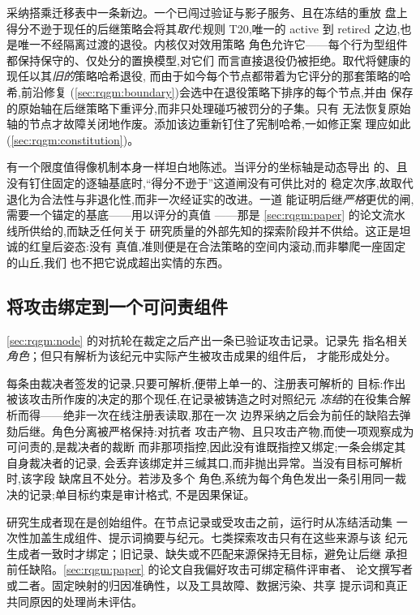 采纳搭乘迁移表中一条新边。一个已闯过验证与影子服务、且在冻结的重放
盘上得分不逊于现任的后继策略会将其\emph{取代}:规则 T20,唯一的
active 到 retired 之边,也是唯一不经隔离过渡的退役。内核仅对效用策略
角色允许它——每个行为型组件都保持保守的、仅处分的置换模型,对它们
而言直接退役仍被拒绝。取代将健康的现任以其\emph{旧的}策略哈希退役,
而由于如今每个节点都带着为它评分的那套策略的哈希,前沿修复
(\cref{sec:rqgm:boundary})会选中在退役策略下排序的每个节点,并由
保存的原始轴在后继策略下重评分,而非只处理碰巧被罚分的子集。只有
无法恢复原始轴的节点才故障关闭地作废。添加该边重新钉住了宪制哈希,一如修正案
理应如此(\cref{sec:rqgm:constitution})。

有一个限度值得像机制本身一样坦白地陈述。当评分的坐标轴是动态导出
的、且没有钉住固定的逐轴基底时,“得分不逊于”这道闸没有可供比对的
稳定次序,故取代退化为合法性与非退化性,而非一次经证实的改进。一道
能证明后继\emph{严格}更优的闸,需要一个锚定的基底——用以评分的真值
——那是 \cref{sec:rqgm:paper} 的论文流水线所供给的,而缺乏任何关于
研究质量的外部先知的探索阶段并不供给。这正是坦诚的红皇后姿态:没有
真值,准则便是在合法策略的空间内滚动,而非攀爬一座固定的山丘,我们
也不把它说成超出实情的东西。

\subsection{将攻击绑定到一个可问责组件}\label{sec:rqgm:targetbinding}

\cref{sec:rqgm:node} 的对抗轮在裁定之后产出一条已验证攻击记录。记录先
指名相关\emph{角色}；但只有解析为该纪元中实际产生被攻击成果的组件后，
才能形成处分。

每条由裁决者签发的记录,只要可解析,便带上单一的、注册表可解析的
目标:作出被该攻击所作废的决定的那个现任,在记录被铸造之时对照纪元
\emph{冻结}的在役集合解析而得——绝非一次在线注册表读取,那在一次
边界采纳之后会为前任的缺陷去弹劾后继。角色分离被严格保持:对抗者
攻击产物、且只攻击产物,而使一项观察成为可问责的,是裁决者的裁断
而非那项指控,因此没有谁既指控又绑定;一条会绑定其自身裁决者的记录,
会丢弃该绑定并三缄其口,而非抛出异常。当没有目标可解析时,该字段
缺席且不处分。若涉及多个
角色,系统为每个角色发出一条引用同一裁决的记录;单目标约束是审计格式,
不是因果保证。

研究生成者现在是创始组件。在节点记录或受攻击之前，运行时从冻结活动集
一次性加盖生成组件、提示词摘要与纪元。七类探索攻击只有在这些来源与该
纪元生成者一致时才绑定；旧记录、缺失或不匹配来源保持无目标，避免让后继
承担前任缺陷。\cref{sec:rqgm:paper} 的论文自我偏好攻击可绑定稿件评审者、
论文撰写者或二者。固定映射的归因准确性，以及工具故障、数据污染、共享
提示词和真正共同原因的处理尚未评估。

